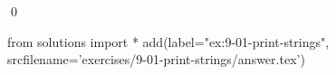 
\begin{ex}
  \label{ex:9-01-print-strings}
  
  \qed
\end{ex}
\begin{python0}
from solutions import *
add(label="ex:9-01-print-strings",
    srcfilename='exercises/9-01-print-strings/answer.tex')
\end{python0}
